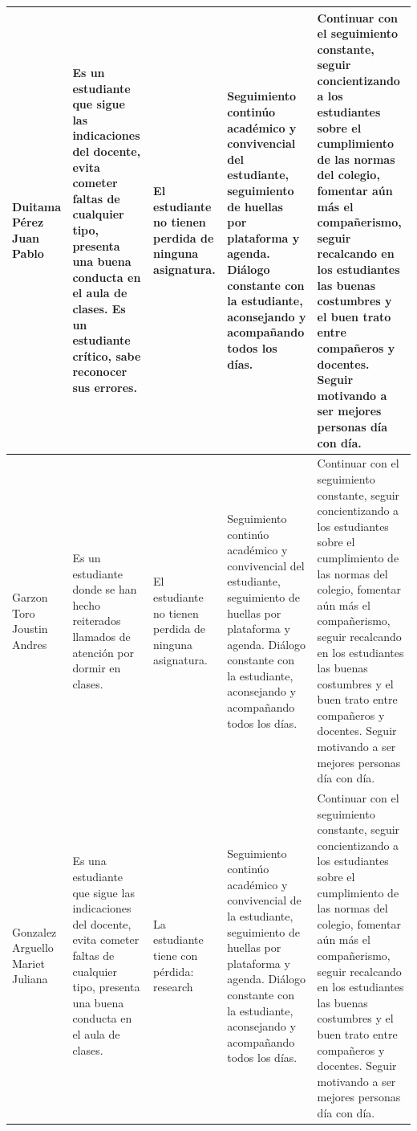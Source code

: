 \documentclass[spanish,11pt,a4paper]{article}
\begin{document}
\begin{longtable}{|p{3.5cm}|p{3.5cm}|p{3.5cm}|p{3.5cm}|p{3.5cm}|}
		Duitama Pérez Juan Pablo & 
		Es un estudiante que sigue las indicaciones del docente, evita cometer faltas de cualquier tipo, presenta una buena conducta en el aula de clases. Es un estudiante crítico, sabe reconocer sus errores. & 
		El estudiante no tienen perdida de ninguna asignatura. & 
		Seguimiento continúo académico y convivencial del estudiante, seguimiento de huellas por plataforma y agenda. Diálogo constante con la estudiante, aconsejando y acompañando todos los días. & 
		Continuar con el seguimiento constante, seguir concientizando a los estudiantes sobre el cumplimiento de las normas del colegio, fomentar aún más el compañerismo, seguir recalcando en los estudiantes las buenas costumbres y el buen trato entre compañeros y docentes. Seguir motivando a ser mejores personas día con día.\\
		\hline
		
		Garzon Toro Joustin Andres & 
		Es un estudiante donde se han hecho reiterados llamados de atención por dormir en clases. & 
		El estudiante no tienen perdida de ninguna asignatura.  & 
		Seguimiento continúo académico y convivencial del estudiante, seguimiento de huellas por plataforma y agenda. Diálogo constante con la estudiante, aconsejando y acompañando todos los días. & 
		Continuar con el seguimiento constante, seguir concientizando a los estudiantes sobre el cumplimiento de las normas del colegio, fomentar aún más el compañerismo, seguir recalcando en los estudiantes las buenas costumbres y el buen trato entre compañeros y docentes. Seguir motivando a ser mejores personas día con día.\\
		\hline
		
		Gonzalez Arguello Mariet Juliana & 
		Es una estudiante que sigue las indicaciones del docente, evita cometer faltas de cualquier tipo, presenta una buena conducta en el aula de clases. & 
		La estudiante tiene con pérdida: research & 
		Seguimiento continúo académico y convivencial de la estudiante, seguimiento de huellas por plataforma y agenda. Diálogo constante con la estudiante, aconsejando y acompañando todos los días. & 
		Continuar con el seguimiento constante, seguir concientizando a los estudiantes sobre el cumplimiento de las normas del colegio, fomentar aún más el compañerismo, seguir recalcando en los estudiantes las buenas costumbres y el buen trato entre compañeros y docentes. Seguir motivando a ser mejores personas día con día.\\
		\hline
		

\end{longtable}
\end{document}

